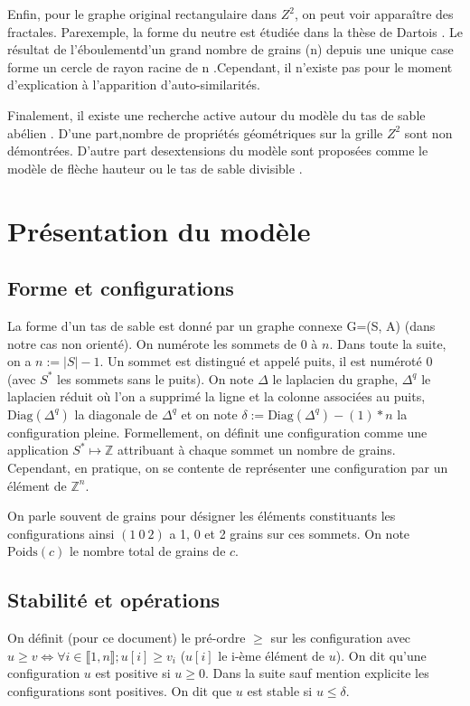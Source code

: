\documentclass{report}
\newcommand{\poids}[1]{\ensuremath{\text{Poids}(#1)}}
\newcommand{\diag}[1]{\ensuremath{\text{Diag}(#1)}}
\newcommand{\card}[1]{\ensuremath{|#1|}}
\begin{document}
Enfin, pour le graphe original rectangulaire dans $Z^2$, on peut voir apparaître des fractales. Parexemple, la forme du neutre est étudiée dans la thèse de Dartois \cite{thPoly}. Le résultat de l’éboulementd’un grand nombre de grains (n) depuis une unique case forme un cercle de rayon racine de n \cite{geoid} .Cependant, il n’existe pas pour le moment d’explication à l’apparition d’auto-similarités. 

Finalement, il existe une recherche active autour du modèle du tas de sable abélien \cite{thBordeaux}. D’une part,nombre de propriétés géométriques sur la grille $Z^2$ sont non démontrées. D’autre part desextensions du modèle sont proposées comme le modèle de flèche hauteur \cite{thPoly} ou le tas de sable divisible \cite{divisible}.

\chapter{Présentation du modèle}
\section{Forme et configurations}

La forme d'un tas de sable est donné par un graphe connexe G=(S, A) (dans notre cas non orienté). On numérote les sommets de 0 à $n$. Dans toute la suite, on a $n := \card{S} - 1$.
Un sommet est distingué et appelé puits, il est numéroté 0 (avec $S^*$ les sommets sans le puits). On note $\Delta$ le laplacien du graphe, $\Delta^q$ le laplacien réduit où l'on a supprimé la ligne et la colonne associées au puits, $\diag{\Delta^q}$ la diagonale de $\Delta^q$ et on note $\delta := \diag{\Delta^q} - (1) * n$ la configuration pleine. Formellement, on définit une configuration comme une application $S^* \mapsto \mathbb{Z}$ attribuant à chaque sommet un nombre de grains. Cependant, en pratique, on se contente de représenter une configuration par un élément de $\mathbb{Z}^n$.

On parle souvent de grains pour désigner les éléments constituants les configurations ainsi $(1\ 0\ 2)$ a 1, 0 et 2 grains sur ces sommets. On note \poids{c} le nombre total de grains de $c$.

\section{Stabilité et opérations}

On définit (pour ce document) le pré-ordre $\geq $ sur les configuration avec $u \geq v \Leftrightarrow \forall i \in \llbracket 1, n  \rrbracket; u[i] \geq v_i$ ($u[i]$ le i-ème élément de $u$). On dit qu'une configuration $u$ est positive si $u \geq 0$. Dans la suite sauf mention explicite les configurations sont positives. On dit que $u$ est stable si $u \leq \delta$. 
\end{document}
